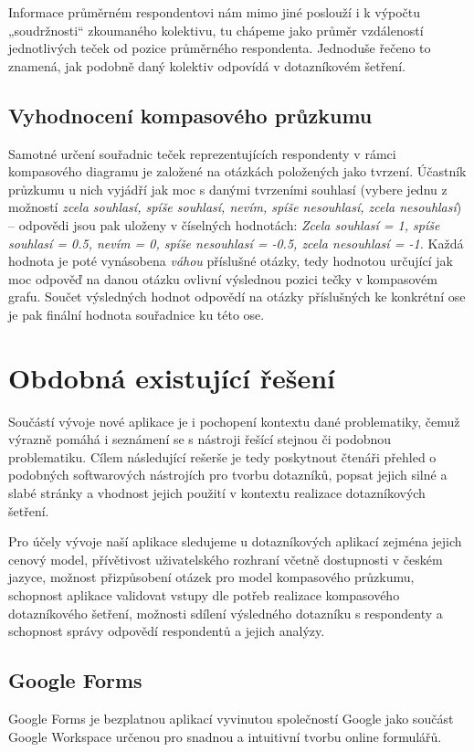 Informace průměrném respondentovi nám mimo jiné poslouží i k výpočtu „soudržnosti“ zkoumaného kolektivu, tu chápeme jako průměr vzdáleností jednotlivých teček od pozice průměrného respondenta. Jednoduše řečeno to znamená, jak podobně daný kolektiv odpovídá v dotazníkovém šetření.

\subsection{Vyhodnocení kompasového průzkumu}
Samotné určení souřadnic teček reprezentujících respondenty v rámci kompasového diagramu
je založené na otázkách položených jako tvrzení. Účastník průzkumu u nich vyjádří
jak moc s danými tvrzeními souhlasí (vybere jednu z možností \textit{zcela souhlasí, spíše souhlasí, nevím, spíše nesouhlasí, zcela nesouhlasí}) – 
odpovědi jsou pak uloženy v číselných hodnotách: \textit{Zcela souhlasí = 1, spíše souhlasí = 0.5, nevím = 0, spíše nesouhlasí = -0.5, zcela nesouhlasí = -1.}
Každá hodnota je poté vynásobena \textit{váhou} příslušné otázky, tedy hodnotou určující jak moc
odpověď na danou otázku ovlivní výslednou pozici tečky v kompasovém grafu. Součet výsledných hodnot odpovědí na otázky příslušných
ke konkrétní ose je pak finální hodnota souřadnice ku této ose.

\section{Obdobná existující řešení}
Součástí vývoje nové aplikace je i pochopení kontextu dané problematiky, čemuž výrazně pomáhá i seznámení se s 
nástroji řešící stejnou či podobnou problematiku. Cílem následující rešerše je tedy poskytnout čtenáři přehled o 
podobných softwarových nástrojích pro tvorbu dotazníků, popsat jejich silné a slabé stránky a vhodnost jejich 
použití v kontextu realizace dotazníkových šetření.

Pro účely vývoje naší aplikace sledujeme u dotazníkových aplikací zejména jejich cenový model, přívětivost 
uživatelského rozhraní včetně dostupnosti v českém jazyce, možnost přizpůsobení otázek pro model kompasového 
průzkumu, schopnost aplikace validovat vstupy dle potřeb realizace kompasového dotazníkového šetření, možnosti
sdílení výsledného dotazníku s respondenty a schopnost správy odpovědí respondentů a jejich analýzy.

\subsection{Google Forms}
Google Forms je bezplatnou aplikací vyvinutou společností Google jako součást Google Workspace určenou pro 
snadnou a intuitivní tvorbu online formulářů. 


